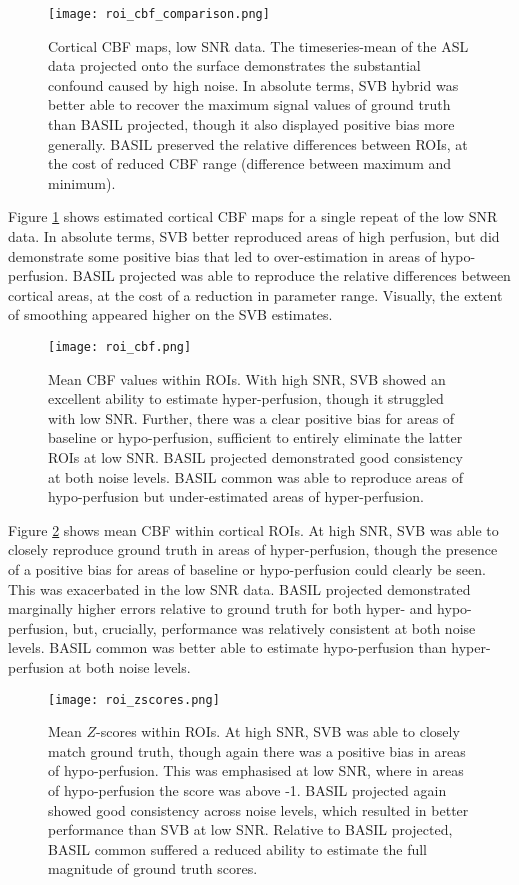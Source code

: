 \begin{figure}[H]
\centering
\texttt{[image: roi\_cbf\_comparison.png]}
\caption{Cortical CBF maps, low SNR data. The timeseries-mean of the ASL data projected onto the surface demonstrates the substantial confound caused by high noise. In absolute terms, SVB hybrid was better able to recover the maximum signal values of ground truth than BASIL projected, though it also displayed positive bias more generally. BASIL preserved the relative differences between ROIs, at the cost of reduced CBF range (difference between maximum and minimum).}
\label{roi_cbf_comparison} 
\end{figure}

Figure \ref{roi_cbf_comparison} shows estimated cortical CBF maps for a single repeat of the low SNR data. In absolute terms, SVB better reproduced areas of high perfusion, but did demonstrate some positive bias that led to over-estimation in areas of hypo-perfusion. BASIL projected was able to reproduce the relative differences between cortical areas, at the cost of a reduction in parameter range. Visually, the extent of smoothing appeared higher on the SVB estimates. 

\begin{figure}[H]
\centering
\texttt{[image: roi\_cbf.png]}
\caption{Mean CBF values within ROIs. With high SNR, SVB showed an excellent ability to estimate hyper-perfusion, though it struggled with low SNR. Further, there was a clear positive bias for areas of baseline or hypo-perfusion, sufficient to entirely eliminate the latter ROIs at low SNR. BASIL projected demonstrated good consistency at both noise levels. BASIL common was able to reproduce areas of hypo-perfusion but under-estimated areas of hyper-perfusion.}
\label{roi_cbf} 
\end{figure}

Figure \ref{roi_cbf} shows mean CBF within cortical ROIs. At high SNR, SVB was able to closely reproduce ground truth in areas of hyper-perfusion, though the presence of a positive bias for areas of baseline or hypo-perfusion could clearly be seen. This was exacerbated in the low SNR data. BASIL projected demonstrated marginally higher errors relative to ground truth for both hyper- and hypo-perfusion, but, crucially, performance was relatively consistent at both noise levels. BASIL common was better able to estimate hypo-perfusion than hyper-perfusion at both noise levels. 

\begin{figure}[H]
\centering
\texttt{[image: roi\_zscores.png]}
\caption{Mean $Z$-scores within ROIs. At high SNR, SVB was able to closely match ground truth, though again there was a positive bias in areas of hypo-perfusion. This was emphasised at low SNR, where in areas of hypo-perfusion the score was above -1. BASIL projected again showed good consistency across noise levels, which resulted in better performance than SVB at low SNR. Relative to BASIL projected, BASIL common suffered a reduced ability to estimate the full magnitude of ground truth scores.}
\label{roi_zscores} 
\end{figure}

